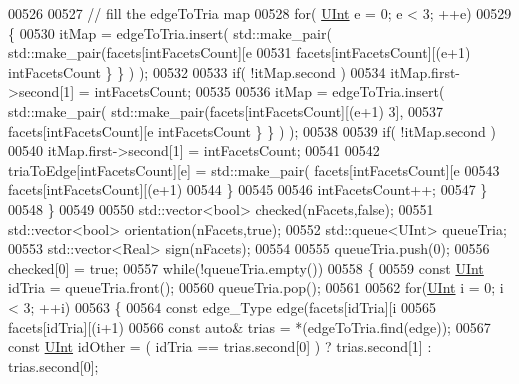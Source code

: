 \begin{DoxyCode}
00526 
00527                 \textcolor{comment}{// fill the edgeToTria map}
00528                 \textcolor{keywordflow}{for}( \hyperlink{namespaceFVCode3D_a4bf7e328c75d0fd504050d040ebe9eda}{UInt} e = 0; e < 3; ++e)
00529                 \{
00530                     itMap = edgeToTria.insert( std::make\_pair( std::make\_pair(facets[intFacetsCount][e%
00531                             facets[intFacetsCount][(e+1)%
      intFacetsCount \} \} ) );
00532 
00533                     \textcolor{keywordflow}{if}( !itMap.second )
00534                         itMap.first->second[1] = intFacetsCount;
00535 
00536                     itMap = edgeToTria.insert( std::make\_pair( std::make\_pair(facets[intFacetsCount][(e+1)%
      3],
00537                             facets[intFacetsCount][e%
      intFacetsCount \} \} ) );
00538 
00539                     \textcolor{keywordflow}{if}( !itMap.second )
00540                         itMap.first->second[1] = intFacetsCount;
00541 
00542                     triaToEdge[intFacetsCount][e] = std::make\_pair( facets[intFacetsCount][e%
00543                                                                     facets[intFacetsCount][(e+1)%
00544                 \}
00545 
00546                 intFacetsCount++;
00547             \}
00548         \}
00549 
00550         std::vector<bool> checked(nFacets,\textcolor{keyword}{false});
00551         std::vector<bool> orientation(nFacets,\textcolor{keyword}{true});
00552         std::queue<UInt> queueTria;
00553         std::vector<Real> sign(nFacets);
00554 
00555         queueTria.push(0);
00556         checked[0] = \textcolor{keyword}{true};
00557         \textcolor{keywordflow}{while}(!queueTria.empty())
00558         \{
00559             \textcolor{keyword}{const} \hyperlink{namespaceFVCode3D_a4bf7e328c75d0fd504050d040ebe9eda}{UInt} idTria = queueTria.front();
00560             queueTria.pop();
00561 
00562             \textcolor{keywordflow}{for}(\hyperlink{namespaceFVCode3D_a4bf7e328c75d0fd504050d040ebe9eda}{UInt} i = 0; i < 3; ++i)
00563             \{
00564                 \textcolor{keyword}{const} edge\_Type edge(facets[idTria][i%
00565                                      facets[idTria][(i+1)%
00566                 \textcolor{keyword}{const} \textcolor{keyword}{auto}& trias = *(edgeToTria.find(edge));
00567                 \textcolor{keyword}{const} \hyperlink{namespaceFVCode3D_a4bf7e328c75d0fd504050d040ebe9eda}{UInt} idOther = ( idTria == trias.second[0] ) ? trias.second[1] : trias.second[0];

\end{DoxyCode}
